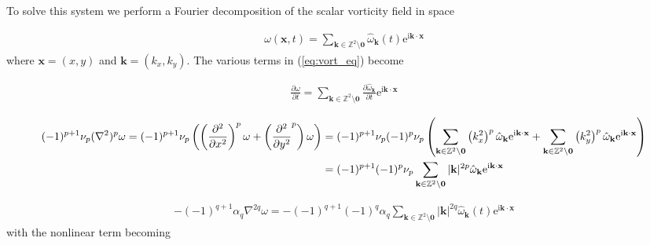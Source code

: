 \documentclass[9pt]{article}
\newcommand{\pder}[2]{\frac{\partial #1}{\partial #2}}               %
\newcommand{\ppder}[2]{\frac{\partial^2 #1}{\partial {#2}^2}}        %
\newcommand{\ii}{\mathrm{i}}      								  %
\newcommand{\e}{\mathrm{e}}      								  %
\newcommand{\omegahat}[1]{\hat{\omega}_{ \mathbf{#1} } }								%
\newcommand{\bfx}{\mathbf{x}}								%
\newcommand{\bfk}{\mathbf{k}}								%
\begin{document}
To solve this system we perform a Fourier decomposition of the scalar vorticity field in space

\begin{align}
	\omega(\mathbf{x}, t) = \sum_{\mathbf{k}\in \mathbb{Z}^2\setminus \mathbf{0}}\hat{\omega}_{\mathbf{k}}(t)\e^{\ii \mathbf{k}\cdot \mathbf{x}}
	\label{eq:fourier_decomp}
\end{align}
where $\bfx = (x, y)$ and $\bfk = (k_x, k_y)$. The various terms in (\ref{eq:vort_eq}) become

\begin{align}
	\pder{\omega}{t} = \sum_{\bfk \in \mathbb{Z}^2\setminus \mathbf{0}} \pder{\omegahat{k}}{t} \e^{\ii \mathbf{k}\cdot \mathbf{x}}
\end{align}


\begin{align}
	(-1)^{p + 1}\nu_p (\nabla^2)^p  \omega =  (-1)^{p + 1}\nu_p \left(\left(\ppder{}{x}\right)^p\omega + \left(\ppder{}{y}^p\right)\omega\right) &= (-1)^{p + 1}\nu_p (-1)^p\nu_p\left(\sum_{\mathbf{k}\in \mathbb{Z}^2\setminus \mathbf{0}} \left(k_x^2\right)^p\hat{\omega}_{\mathbf{k}}\e^{\ii \mathbf{k}\cdot \mathbf{x}} +\sum_{\mathbf{k}\in \mathbb{Z}^2\setminus \mathbf{0}} \left(k_y^2\right)^p\hat{\omega}_{\mathbf{k}}\e^{\ii \mathbf{k}\cdot \mathbf{x}} \right)\notag \\
	&= (-1)^{p + 1}(-1)^p\nu_p\sum_{\mathbf{k}\in \mathbb{Z}^2\setminus \mathbf{0}} |\bfk|^{2p}\hat{\omega}_{\mathbf{k}}\e^{\ii \mathbf{k}\cdot \mathbf{x}}
\end{align}

\begin{align}
	-(-1)^{q + 1}\alpha_q \nabla^{2q}\omega = -(-1)^{q + 1} (-1)^{q}\alpha_q \sum_{\mathbf{k}\in \mathbb{Z}^2\setminus \mathbf{0}} |\bfk|^{2q}\hat{\omega}_{\mathbf{k}}(t)\e^{\ii \mathbf{k}\cdot \mathbf{x}}
\end{align}
with the nonlinear term becoming 
\end{document}
